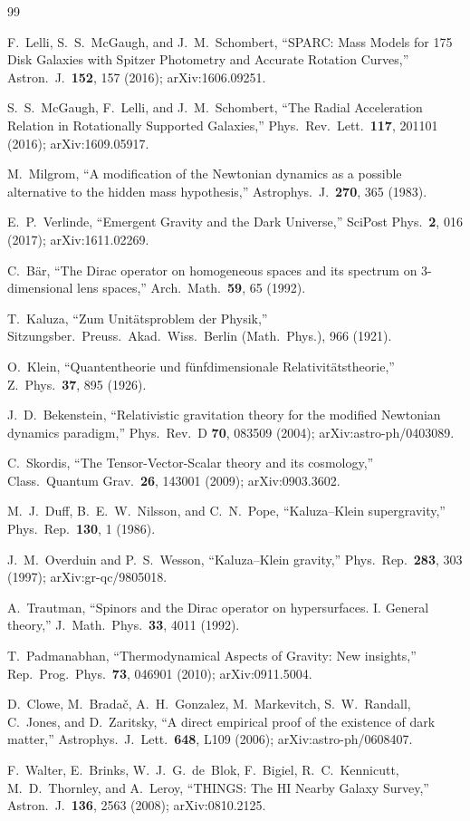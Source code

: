 \documentclass[11pt,a4paper]{article}
\begin{document}
\begin{thebibliography}{99}

F.~Lelli, S.~S.~McGaugh, and J.~M.~Schombert,
``SPARC: Mass Models for 175 Disk Galaxies with Spitzer Photometry and Accurate Rotation Curves,''
Astron.\ J.\ \textbf{152}, 157 (2016); arXiv:1606.09251.

S.~S.~McGaugh, F.~Lelli, and J.~M.~Schombert,
``The Radial Acceleration Relation in Rotationally Supported Galaxies,''
Phys.\ Rev.\ Lett.\ \textbf{117}, 201101 (2016); arXiv:1609.05917.

M.~Milgrom,
``A modification of the Newtonian dynamics as a possible alternative to the hidden mass hypothesis,''
Astrophys.\ J.\ \textbf{270}, 365 (1983).

E.~P.~Verlinde,
``Emergent Gravity and the Dark Universe,''
SciPost Phys.\ \textbf{2}, 016 (2017); arXiv:1611.02269.

C.~B\"ar,
``The Dirac operator on homogeneous spaces and its spectrum on 3-dimensional lens spaces,''
Arch.\ Math.\ \textbf{59}, 65 (1992).

T.~Kaluza,
``Zum Unit\"atsproblem der Physik,''
Sitzungsber.\ Preuss.\ Akad.\ Wiss.\ Berlin (Math.\ Phys.), 966 (1921).

O.~Klein,
``Quantentheorie und f\"unfdimensionale Relativit\"atstheorie,''
Z.\ Phys.\ \textbf{37}, 895 (1926).

J.~D.~Bekenstein,
``Relativistic gravitation theory for the modified Newtonian dynamics paradigm,''
Phys.\ Rev.\ D \textbf{70}, 083509 (2004); arXiv:astro-ph/0403089.

C.~Skordis,
``The Tensor-Vector-Scalar theory and its cosmology,''
Class.\ Quantum Grav.\ \textbf{26}, 143001 (2009); arXiv:0903.3602.

M.~J.~Duff, B.~E.~W.~Nilsson, and C.~N.~Pope,
``Kaluza--Klein supergravity,''
Phys.\ Rep.\ \textbf{130}, 1 (1986).

J.~M.~Overduin and P.~S.~Wesson,
``Kaluza--Klein gravity,''
Phys.\ Rep.\ \textbf{283}, 303 (1997); arXiv:gr-qc/9805018.

A.~Trautman,
``Spinors and the Dirac operator on hypersurfaces. I. General theory,''
J.\ Math.\ Phys.\ \textbf{33}, 4011 (1992).

T.~Padmanabhan,
``Thermodynamical Aspects of Gravity: New insights,''
Rep.\ Prog.\ Phys.\ \textbf{73}, 046901 (2010); arXiv:0911.5004.

D.~Clowe, M.~Brada\v{c}, A.~H.~Gonzalez, M.~Markevitch, S.~W.~Randall, C.~Jones, and D.~Zaritsky,
``A direct empirical proof of the existence of dark matter,''
Astrophys.\ J.\ Lett.\ \textbf{648}, L109 (2006); arXiv:astro-ph/0608407.

F.~Walter, E.~Brinks, W.~J.~G.~de~Blok, F.~Bigiel, R.~C.~Kennicutt, M.~D.~Thornley, and A.~Leroy,
``THINGS: The HI Nearby Galaxy Survey,''
Astron.\ J.\ \textbf{136}, 2563 (2008); arXiv:0810.2125.

\end{thebibliography}
\end{document}
